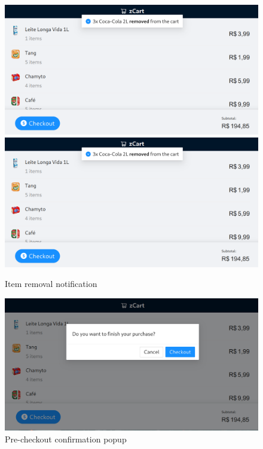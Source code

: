 \documentclass[openright]{normas-utf-tex} %
\begin{document}
\begin{figure}[H]
	\centering
	\includegraphics[width=1\textwidth]{./images/userapp3.png}
	\includegraphics[width=1\textwidth]{./images/userapp3.png}
	\caption[]{Item removal notification}
\end{figure}

\begin{figure}[H]
	\centering
	\includegraphics[width=1\textwidth]{./images/userapp4.png}
	\caption[]{Pre-checkout confirmation popup}
\end{figure}
\end{document}
